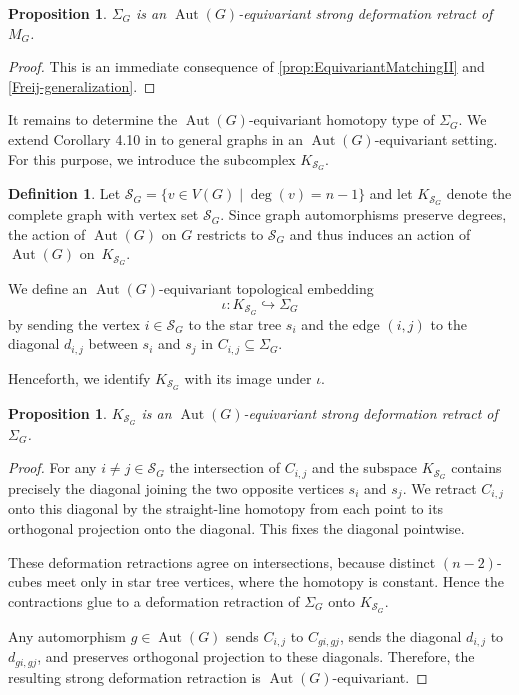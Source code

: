 \documentclass[reqno,dvipsnames]{amsart}
\theoremstyle{plain}
\newtheorem{proposition}[theorem]{Proposition}
\numberwithin{equation}{section}
\theoremstyle{definition}
\newtheorem{definition}[theorem]{Definition}
\DeclareMathOperator{\Aut}{Aut}
\begin{document}
\begin{proposition}\label{prop:MontoSigma}
	$\Sigma_G$ is an $\Aut(G)$-equivariant strong deformation retract of $M_G$. 
\end{proposition}

\begin{proof}
	This is an immediate consequence of \autoref{prop:EquivariantMatchingII} and \autoref{Freij-generalization}. 
\end{proof}

It remains to determine the $\Aut(G)$-equivariant homotopy type of $\Sigma_G$. We extend Corollary 4.10 in \cite{Kozlov25} to general graphs in an $\Aut(G)$-equivariant setting. For this purpose, we introduce the subcomplex $K_{\mathcal{S}_G}$.

\begin{definition} 
	Let $\mathcal{S}_G = \{v\in V(G)\mid \deg(v) = n-1\}$ and let $K_{\mathcal S_G}$ denote the complete graph with vertex set $\mathcal S_G$. Since graph automorphisms preserve degrees, the action of $\Aut(G)$ on $G$ restricts to $\mathcal{S}_G$ and thus induces an action of $\Aut(G)$ on~$K_{\mathcal{S}_G}$. 
	
	We define an $\Aut(G)$-equivariant topological embedding 
	\[
	\iota\colon K_{\mathcal S_G}\hookrightarrow \Sigma_G 
	\]
	by sending the vertex $i\in\mathcal S_G$ to the star tree $s_i$ and the edge $(i,j)$ to the diagonal $d_{i,j}$ between $s_i$ and $s_j$ in $C_{i,j}\subseteq \Sigma_G$.
	
	Henceforth, we identify $K_{\mathcal S_G}$ with its image under $\iota$.
\end{definition}

\begin{proposition}\label{lem:graphinclusion}
	$K_{\mathcal{S}_G}$ is an $\Aut(G)$-equivariant strong deformation retract of~$\Sigma_G$.
\end{proposition}

\begin{proof}
	For any $i\neq j\in \mathcal{S}_G$ the intersection of $C_{i,j}$ and the subspace $K_{\mathcal S_G}$ contains precisely the diagonal joining the two opposite vertices $s_i$ and $s_j$. We retract $C_{i,j}$ onto this diagonal by the straight-line homotopy from each point to its orthogonal projection onto the diagonal. This fixes the diagonal pointwise.
	
	These deformation retractions agree on intersections, because distinct $(n-2)$-cubes meet only in star tree vertices, where the homotopy is constant. Hence the contractions glue to a deformation retraction of $\Sigma_G$ onto $K_{\mathcal S_G}$.
	
	Any automorphism $g\in \Aut(G)$ sends $C_{i,j}$ to $C_{g i,g j}$, sends the diagonal $d_{i,j}$ to $d_{g i,g j}$, and preserves orthogonal projection to these diagonals. Therefore, the resulting strong deformation retraction is $\Aut(G)$-equivariant.
\end{proof}
\end{document}
